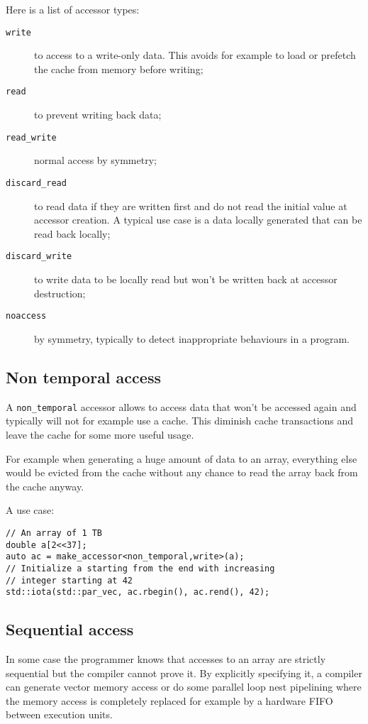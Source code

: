 \documentclass[a4paper]{article}
\begin{document}
Here is a list of accessor types:
\begin{description}
\item[\texttt{write}] to access to a write-only data. This avoids for
  example to load or prefetch the cache from memory before writing;
\item[\texttt{read}] to prevent writing back data;
\item[\texttt{read\_write}] normal access by symmetry;
\item[\texttt{discard\_read}] to read data if they are written first
  and do not read the initial value at accessor creation. A typical
  use case is a data locally generated that can be read back locally;
\item[\texttt{discard\_write}] to write data to be locally read but
  won't be written back at accessor destruction;
\item[\texttt{noaccess}] by symmetry, typically to detect
  inappropriate behaviours in a program.
\end{description}


\subsection{Non temporal access}
\label{sec:non-temporal-access}

A \lstinline|non_temporal| accessor allows to access data that won't
be accessed again and typically will not for example use a cache. This
diminish cache transactions and leave the cache for some more useful
usage.

For example when generating a huge amount of data to an array, everything else
would be evicted from the cache without any chance to read the array
back from the cache anyway.

A use case:
\begin{lstlisting}
// An array of 1 TB
double a[2<<37];
auto ac = make_accessor<non_temporal,write>(a);
// Initialize a starting from the end with increasing
// integer starting at 42
std::iota(std::par_vec, ac.rbegin(), ac.rend(), 42);
\end{lstlisting}


\subsection{Sequential access}
\label{sec:sequential-access}

In some case the programmer knows that accesses to an array are
strictly sequential but the compiler cannot prove it. By explicitly
specifying it, a compiler can generate vector memory access or do some
parallel loop nest pipelining where the memory access is completely
replaced for example by a hardware FIFO between execution units.
\end{document}
